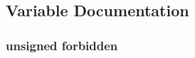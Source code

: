 \subsection{Variable Documentation}
\subsubsection[{\texorpdfstring{forbidden}{forbidden}}]{\setlength{\rightskip}{0pt plus 5cm}unsigned forbidden}\hypertarget{group__ap__check__cmd__context_gaa8fe61c30570a9b64a653893ff2d9769}{}\label{group__ap__check__cmd__context_gaa8fe61c30570a9b64a653893ff2d9769}
